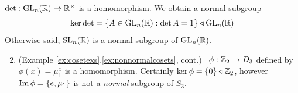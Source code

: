 \begin{examples}{}{}
	\exstart $\det:\mathrm{GL}_n(\mathbb{R})\to\mathbb{R}^\times$ is a homomorphism. We obtain a normal subgroup
	\[
		\ker\det=\{A\in\mathrm{GL}_n(\mathbb{R}):\det A=1\}
		\triangleleft\mathrm{GL}_n(\mathbb{R})
	\]
	Otherwise said, $\mathrm{SL}_n(\mathbb{R})$ is a normal subgroup of $\mathrm{GL}_n(\mathbb{R})$.
	\begin{enumerate}\setcounter{enumi}{1}
  	\item (Example \ref*{ex:cosetexs}.\ref{ex:nonnormalcosets}, cont.) \ $\phi:\mathbb{Z}_2\to D_3$ defined by $\phi(x)=\mu_1^x$ is a homomorphism. Certainly $\ker\phi=\{0\}\triangleleft\mathbb{Z}_2$, however $\operatorname{Im}\phi=\{e,\mu_1\}$ is not a \emph{normal} subgroup of $S_3$.
	\end{enumerate}
\end{examples}

\goodbreak


